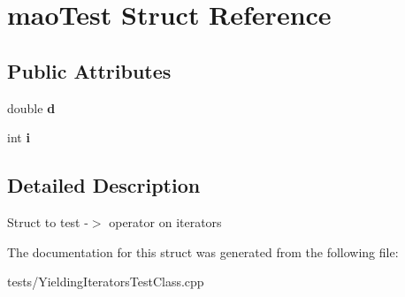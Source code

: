 \hypertarget{structmaoTest}{}\section{mao\+Test Struct Reference}
\label{structmaoTest}
\subsection*{Public Attributes}
\begin{DoxyCompactItemize}
\item 
\mbox{\label{structmaoTest_adb17342b4769503ef1c86f96d9017d45}} 
double {\bfseries d}
\item 
\mbox{\label{structmaoTest_a907dd3056df9b7690521239a39753366}} 
int {\bfseries i}
\end{DoxyCompactItemize}


\subsection{Detailed Description}
Struct to test -\/$>$ operator on iterators 

The documentation for this struct was generated from the following file\+:\begin{DoxyCompactItemize}
\item 
tests/Yielding\+Iterators\+Test\+Class.\+cpp\end{DoxyCompactItemize}
